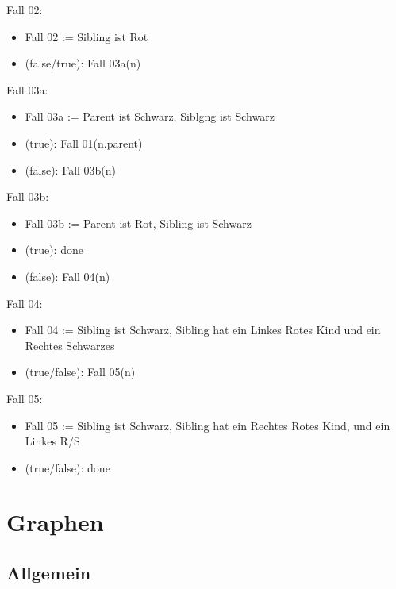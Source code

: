 			\noindent Fall 02:
			\begin{itemize}
				\item Fall 02 := Sibling ist Rot
				\item (false/true): Fall 03a(n) \\
			\end{itemize}

			\noindent Fall 03a:
			\begin{itemize}
				\item Fall 03a := Parent ist Schwarz, Siblgng ist Schwarz
				\item (true): Fall 01(n.parent)
				\item (false): Fall 03b(n) \\
			\end{itemize}

			\noindent Fall 03b:
			\begin{itemize}
				\item Fall 03b := Parent ist Rot, Sibling ist Schwarz
				\item (true): done
				\item (false): Fall 04(n) \\
			\end{itemize}

			\noindent Fall 04:
			\begin{itemize}
				\item Fall 04 := Sibling ist Schwarz, Sibling hat ein Linkes Rotes Kind und ein Rechtes Schwarzes
				\item (true/false): Fall 05(n) \\
			\end{itemize}

			\noindent Fall 05:
			\begin{itemize}
				\item Fall 05 := Sibling ist Schwarz, Sibling hat ein Rechtes Rotes Kind, und ein Linkes R/S
				\item (true/false): done
			\end{itemize}
			

\newpage
\section{Graphen}
	\subsection{Allgemein}
